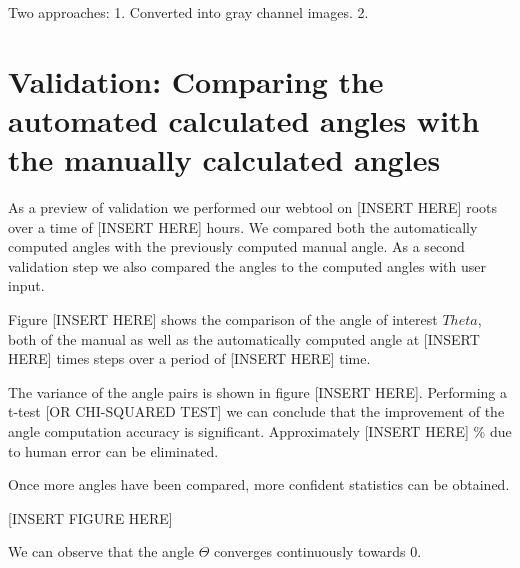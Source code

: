 Two approaches:
1.
Converted into gray channel images.
2.



\section{Validation: Comparing the automated calculated angles with the manually calculated angles}

As a preview of validation we performed our webtool on [INSERT HERE] roots over a time of [INSERT HERE] hours. We compared both the automatically computed angles with the previously computed manual angle. As a second validation step we also compared the angles to the computed angles with user input.

Figure [INSERT HERE] shows the comparison of the angle of interest \( Theta \), both of the manual as well as the automatically computed angle at [INSERT HERE] times steps over a period of [INSERT HERE] time.

The variance of the angle pairs is shown in figure [INSERT HERE]. Performing a t-test [OR CHI-SQUARED TEST] we can conclude that the improvement of the angle computation accuracy is significant. Approximately [INSERT HERE] \% due to human error can be eliminated.

Once more angles have been compared, more confident statistics can be obtained. 

[INSERT FIGURE HERE]

We can observe that the angle \( \Theta \) converges continuously towards 0.

